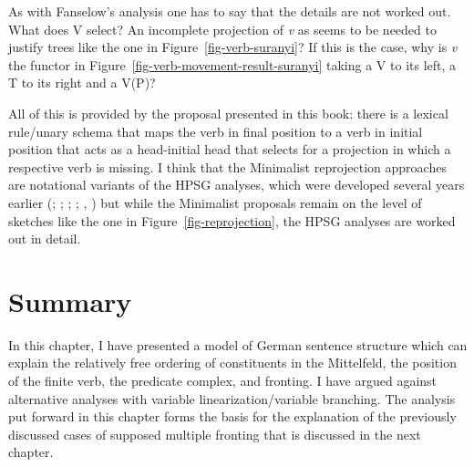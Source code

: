 {{As with Fanselow's analysis one has to say that the details are not worked out. What does V select?
An incomplete projection of \emph{v} as seems to be needed to justify trees like the one in
Figure~\ref{fig-verb-suranyi}? If this is the case, why is \emph{v} the functor in
Figure~\ref{fig-verb-movement-result-suranyi} taking a V to its left, a T to its right and a V(P)?


All of this is provided by the proposal presented in this book: there is a lexical rule/unary schema that maps
the verb in final position to a verb in initial position that acts as a head-initial head that
selects for a projection in which a respective verb is missing. I think that the Minimalist
reprojection approaches are notational variants of the HPSG analyses, which were developed several
years earlier (\citealp*[Section~4.7]{KW91a}; \citealp*{Kiss93}; \citealp*{Frank94}; \citealp*{Kiss95a}; \citealp{Feldhaus97},
\citealp{Meurers2000b}) but while the Minimalist proposals remain on the level of sketches like the
one in Figure~\ref{fig-reprojection}, the HPSG analyses are worked out in detail.




\section{Summary}

In this chapter, I have presented a model of German sentence structure which can explain the relatively
free ordering of constituents in the Mittelfeld, the position of the finite verb, the predicate complex,
and fronting. I have argued against alternative analyses with variable linearization/variable branching.
The analysis put forward in this chapter forms the basis for the explanation of the previously discussed cases 
of supposed multiple fronting that is discussed in the next chapter. 


}}
